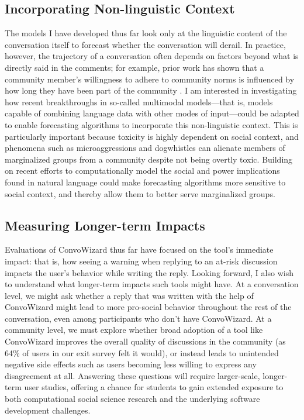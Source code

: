 \documentclass[12pt,letterpaper]{article}
\begin{document}
\subsection{Incorporating Non-linguistic Context}
The models I have developed thus far look only at the linguistic content of the conversation itself to forecast whether the conversation will derail.
In practice, however, the trajectory of a conversation often depends on factors beyond what is directly said in the comments; for example, prior work has shown that a community member's willingness to adhere to community norms is influenced by how long they have been part of the community \cite{danescu-niculescu-mizil_no_2013}.
I am interested in investigating how recent breakthroughs in so-called multimodal models---that is, models capable of combining language data with other modes of input---could be adapted to enable forecasting algorithms to incorporate this non-linguistic context.
This is particularly important because toxicity is highly dependent on social context, and phenomena such as microaggressions and dogwhistles can alienate members of marginalized groups from a community despite not being overtly toxic.
Building on recent efforts to computationally model the social and power implications found in natural language \cite{sap_social_2020} could make forecasting algorithms more sensitive to social context, and thereby allow them to better serve marginalized groups.


\subsection{Measuring Longer-term Impacts}
Evaluations of ConvoWizard thus far have focused on the tool's immediate impact: that is, how seeing a warning when replying to an at-risk discussion impacts the user's behavior while writing the reply.
Looking forward, I also wish to understand what longer-term impacts such tools might have.
At a conversation level, we might ask whether a reply that was written with the help of ConvoWizard might lead to more pro-social behavior throughout the rest of the conversation, even among participants who don't have ConvoWizard.
At a community level, we must explore whether broad adoption of a tool like ConvoWizard improves the overall quality of discussions in the community (as 64\% of users in our exit survey felt it would), or instead leads to unintended negative side effects such as users becoming less willing to express any disagreement at all.
Answering these questions will require larger-scale, longer-term user studies, offering a chance for students to gain extended exposure to both computational social science research and the underlying software development challenges.
\end{document}
